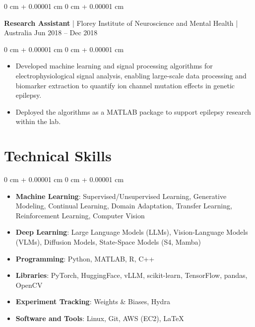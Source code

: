 \documentclass[10pt, letterpaper]{article}
\newenvironment{highlights}{
    \begin{itemize}[
        topsep=0.10 cm,
        parsep=0.10 cm,
        partopsep=0pt,
        itemsep=0pt,
        leftmargin=0 cm + 10pt
    ]
}{
    \end{itemize}
} %
\newenvironment{onecolentry}{
    \begin{adjustwidth}{
        0 cm + 0.00001 cm
    }{
        0 cm + 0.00001 cm
    }
}{
    \end{adjustwidth}
} %
\newenvironment{twocolentry}[2][]{
    \onecolentry
    \def\secondColumn{#2}
    \setcolumnwidth{\fill, 4.5 cm}
    \begin{paracol}{2}
}{
    \switchcolumn \raggedleft \secondColumn
    \end{paracol}
    \endonecolentry
} %
\begin{document}
        \vspace{0.2 cm}
        \begin{twocolentry}{Jun 2018 – Dec 2018}
        \textbf{Research Assistant} | Florey Institute of Neuroscience and Mental Health | Australia\end{twocolentry}
        \vspace{0.10 cm}
        \begin{onecolentry}
            \begin{highlights}
                \item Developed machine learning and signal processing algorithms for electrophysiological signal analysis, enabling large-scale data processing and biomarker extraction to quantify ion channel mutation effects in genetic epilepsy.
                \item Deployed the algorithms as a MATLAB package to support epilepsy research within the lab.
            \end{highlights}
        \end{onecolentry}


    \section{Technical Skills}

    \begin{onecolentry}
        \begin{highlights}
            \item \textbf{Machine Learning}: Supervised/Unsupervised Learning, Generative Modeling, Continual Learning, Domain Adaptation, Transfer Learning, Reinforcement Learning, Computer Vision
            \item \textbf{Deep Learning}: Large Language Models (LLMs), Vision-Language Models (VLMs), Diffusion Models, State-Space Models (S4, Mamba)
            \item \textbf{Programming}: Python, MATLAB, R, C++
            \item \textbf{Libraries}: PyTorch, HuggingFace, vLLM, scikit-learn, TensorFlow, pandas, OpenCV
            \item \textbf{Experiment Tracking}: Weights \& Biases, Hydra
            \item \textbf{Software and Tools}: Linux, Git, AWS (EC2), \LaTeX
        \end{highlights}
    \end{onecolentry}
\end{document}

